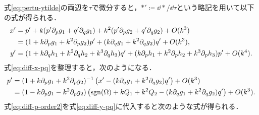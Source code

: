 \documentclass[../main]{subfiles}
\begin{document}
    式\eqref{eq:pertu-ytilde}の両辺を$\tau$で微分すると，$\ast'\coloneqq\dd{\ast}/\dd{\tau}$という略記を用いて以下の式が得られる．
    \begin{align}
        x'&=p'+k(p'\partial_p g_1+q'\partial_q g_1)+k^2(p'\partial_p g_2+q'\partial_q g_2)+O(k^3)\notag\\
        &=(1+k\partial_p g_1+k^2\partial_p g_2)p'+(k\partial_q g_1+k^2\partial_q g_2)q'+O(k^3),\label{eq:diff-x-pq}\\
        y'&=(1+k\partial_q h_1+k^2\partial_q h_2+k^3\partial_q h_3)q'+(k\partial_p h_1+k^2\partial_p h_2+k^3\partial_p h_3)p'+O(k^4).\label{eq:diff-y-pq}
    \end{align}
    式\eqref{eq:diff-x-pq}を整理すると，次のようになる． 
    \begin{align}
        p'&=(1+k\partial_p g_1+k^2\partial_p g_2)^{-1}\left( x'-(k\partial_q g_1+k^2\partial_q g_2)q' \right)+O(k^3)\notag\\
        &=(1-k\partial_p g_1-k^2\partial_p g_2)\left(\operatorname{sgn}(\Omega)+kQ_1+k^2 Q_2-(k\partial_q g_1+k^2\partial_q g_2)q'\right)+O(k^3).\label{eq:diff-p-order2}
    \end{align}
    式\eqref{eq:diff-p-order2}を式\eqref{eq:diff-y-pq}に代入すると次のような式が得られる．
\end{document}
